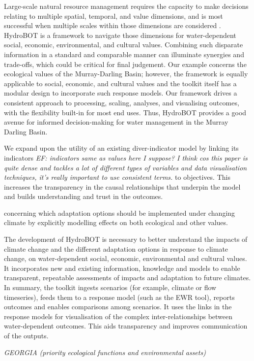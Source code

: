 \documentclass[
  number]{elsarticle}
\begin{document}
Large-scale natural resource management requires the capacity to make
decisions relating to multiple spatial, temporal, and value dimensions,
and is most successful when multiple scales within those dimensions are
considered \citep{moore2021}. HydroBOT is a framework to navigate those
dimensions for water-dependent social, economic, environmental, and
cultural values. Combining such disparate information in a standard and
comparable manner can illuminate synergies and trade-offs, which could
be critical for final judgement. Our example concerns the ecological
values of the Murray-Darling Basin; however, the framework is equally
applicable to social, economic, and cultural values and the toolkit
itself has a modular design to incorporate such response models. Our
framework drives a consistent approach to processing, scaling, analyses,
and visualising outcomes, with the flexibility built-in for most end
uses. Thus, HydroBOT provides a good avenue for informed decision-making
for water management in the Murray Darling Basin.

We expand upon the utility of an existing diver-indicator model by
linking its indicators \emph{EF: indicators same as values here I
suppose? I think cos this paper is quite dense and tackles a lot of
different types of variables and data visualisation techniques, it's
really important to use consistent terms.} to objectives. This increases
the transparency in the causal relationships that underpin the model and
builds understanding and trust in the outcomes.

concerning which adaptation options should be implemented under changing
climate by explicitly modelling effects on both ecological and other
values.

The development of HydroBOT is necessary to better understand the
impacts of climate change and the different adaptation options in
response to climate change, on water-dependent social, economic,
environmental and cultural values. It incorporates new and existing
information, knowledge and models to enable transparent, repeatable
assessments of impacts and adaptation to future climates. In summary,
the toolkit ingests scenarios (for example, climate or flow timeseries),
feeds them to a response model (such as the EWR tool), reports outcomes
and enables comparisons among scenarios. It uses the links in the
response models for visualisation of the complex inter-relationships
between water-dependent outcomes. This aids transparency and improves
communication of the outputs.

\emph{GEORGIA (priority ecological functions and environmental assets)}
\end{document}
